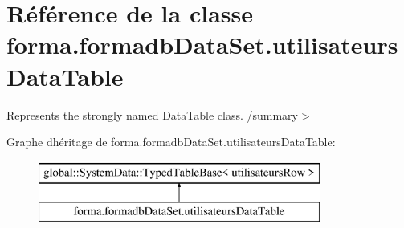 \hypertarget{classforma_1_1formadb_data_set_1_1utilisateurs_data_table}{}\section{Référence de la classe forma.\+formadb\+Data\+Set.\+utilisateurs\+Data\+Table}
\label{classforma_1_1formadb_data_set_1_1utilisateurs_data_table}


Represents the strongly named Data\+Table class. /summary$>$  


Graphe d\textquotesingle{}héritage de forma.\+formadb\+Data\+Set.\+utilisateurs\+Data\+Table\+:\begin{figure}[H]
\begin{center}
\leavevmode
\includegraphics[height=2.000000cm]{classforma_1_1formadb_data_set_1_1utilisateurs_data_table}
\end{center}
\end{figure}
